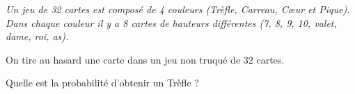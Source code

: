 
\textit{Un jeu de 32 cartes est composé de 4 couleurs (Trèfle, Carreau, Cœur et Pique). Dans chaque couleur il y a 8 cartes de hauteurs différentes (7, 8, 9, 10, valet, dame, roi, as).}

\medskip

On tire au hasard une carte dans un jeu non truqué de $32$ cartes.

Quelle est la probabilité d'obtenir un Trèfle ?

\smallskip
{}
